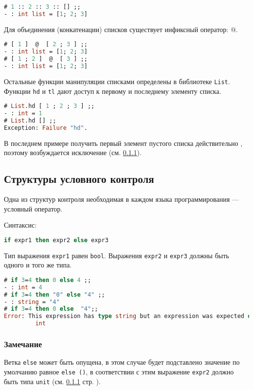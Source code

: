 \begin{lstlisting}[language=OCaml]
# 1 :: 2 :: 3 :: [] ;;
- : int list = [1; 2; 3]
\end{lstlisting}

Для объединения (конкатенации) списков существует инфиксный оператор: @.

\begin{lstlisting}[language=OCaml]
# [ 1 ]  @  [ 2 ; 3 ] ;;
- : int list = [1; 2; 3]
# [ 1 ; 2 ]  @  [ 3 ] ;;
- : int list = [1; 2; 3]
\end{lstlisting}

Остальные функции манипуляции списками определены в библиотеке \texttt{List}.
Функции \texttt{hd} и \texttt{tl} дают доступ к первому и последнему элементу
списка.

\begin{lstlisting}[language=OCaml]
# List.hd [ 1 ; 2 ; 3 ] ;;
- : int = 1
# List.hd [] ;;
Exception: Failure "hd".
\end{lstlisting}

В последнем примере получить первый элемент пустого списка действительно
, поэтому возбуждается исключение (см. \ref{}).

\subsection{Структуры условного контроля}

Одна из структур контроля необходимая в каждом языка программирования ---
условный оператор.

Синтаксис:

\begin{lstlisting}[language=OCaml]
if expr1 then expr2 else expr3
\end{lstlisting}

Тип выражения \texttt{expr1} равен \texttt{bool}. Выражения \texttt{expr2} и
\texttt{expr3} должны быть одного и того же типа.

\begin{lstlisting}[language=OCaml]
# if 3=4 then 0 else 4 ;;
- : int = 4
# if 3=4 then "0" else "4" ;;
- : string = "4"
# if 3=4 then 0 else  "4";;
Error: This expression has type string but an expression was expected of type
         int
\end{lstlisting}

\subsubsection{Замечание}
Ветка \texttt{else} может быть опущена, в этом случае будет подставлено значение
по умолчанию равное \texttt{else ()}, в соответствии с этим выражение
\texttt{expr2} должно быть типа \texttt{unit} (см. \ref{} стр. \pageref{}).

